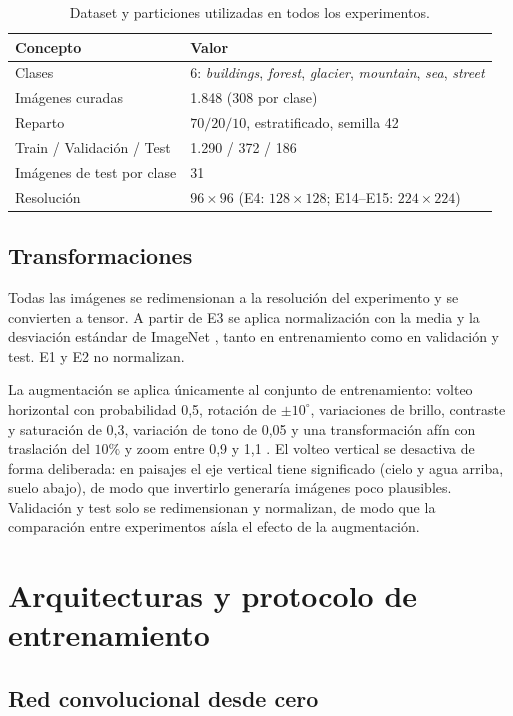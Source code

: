 \documentclass[11pt,a4paper]{article}
\begin{document}
\begin{table}[htbp]
\centering
\small
\caption{Dataset y particiones utilizadas en todos los experimentos.}
\label{tab:datos}
\begin{tabular}{ll}
\toprule
Concepto & Valor \\
\midrule
Clases & 6: \emph{buildings}, \emph{forest}, \emph{glacier}, \emph{mountain}, \emph{sea}, \emph{street} \\
Imágenes curadas & 1.848 (308 por clase) \\
Reparto & $70/20/10$, estratificado, semilla 42 \\
Train / Validación / Test & 1.290 / 372 / 186 \\
Imágenes de test por clase & 31 \\
Resolución & $96\times96$ (E4: $128\times128$; E14--E15: $224\times224$) \\
\bottomrule
\end{tabular}
\end{table}

\subsection{Transformaciones}

Todas las imágenes se redimensionan a la resolución del experimento y se convierten a tensor. A partir de E3 se aplica normalización con la media y la desviación estándar de ImageNet \citep{deng2009imagenet}, tanto en entrenamiento como en validación y test. E1 y E2 no normalizan.

La augmentación se aplica únicamente al conjunto de entrenamiento: volteo horizontal con probabilidad 0,5, rotación de $\pm10^\circ$, variaciones de brillo, contraste y saturación de 0,3, variación de tono de 0,05 y una transformación afín con traslación del $10\%$ y zoom entre 0,9 y 1,1 \citep{shorten2019survey}. El volteo vertical se desactiva de forma deliberada: en paisajes el eje vertical tiene significado (cielo y agua arriba, suelo abajo), de modo que invertirlo generaría imágenes poco plausibles. Validación y test solo se redimensionan y normalizan, de modo que la comparación entre experimentos aísla el efecto de la augmentación.

\section{Arquitecturas y protocolo de entrenamiento}

\subsection{Red convolucional desde cero}
\end{document}
